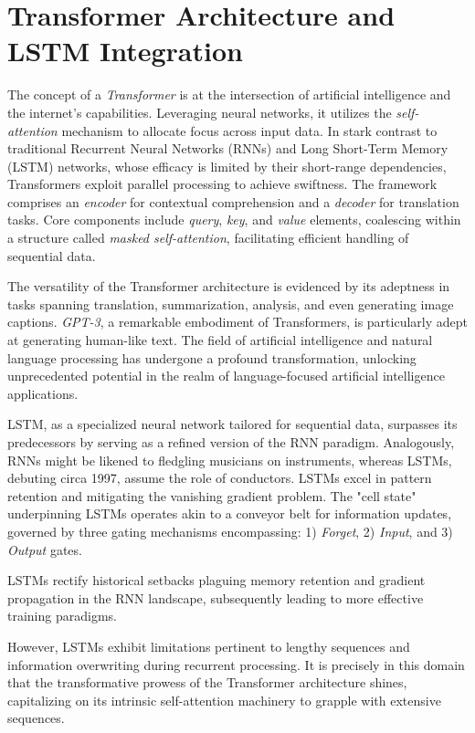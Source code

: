 \documentclass{article}
\begin{document}
\section*{Transformer Architecture and LSTM Integration}

The concept of a \textit{Transformer} is at the intersection of artificial intelligence and the internet's capabilities. Leveraging neural networks, it utilizes the \textit{self-attention} mechanism to allocate focus across input data. In stark contrast to traditional Recurrent Neural Networks (RNNs) and Long Short-Term Memory (LSTM) networks, whose efficacy is limited by their short-range dependencies, Transformers exploit parallel processing to achieve swiftness. The framework comprises an \textit{encoder} for contextual comprehension and a \textit{decoder} for translation tasks. Core components include \textit{query}, \textit{key}, and \textit{value} elements, coalescing within a structure called \textit{masked self-attention}, facilitating efficient handling of sequential data.

The versatility of the Transformer architecture is evidenced by its adeptness in tasks spanning translation, summarization, analysis, and even generating image captions. \textit{GPT-3}, a remarkable embodiment of Transformers, is particularly adept at generating human-like text. The field of artificial intelligence and natural language processing has undergone a profound transformation, unlocking unprecedented potential in the realm of language-focused artificial intelligence applications.

LSTM, as a specialized neural network tailored for sequential data, surpasses its predecessors by serving as a refined version of the RNN paradigm. Analogously, RNNs might be likened to fledgling musicians on instruments, whereas LSTMs, debuting circa 1997, assume the role of conductors. LSTMs excel in pattern retention and mitigating the vanishing gradient problem. The "cell state" underpinning LSTMs operates akin to a conveyor belt for information updates, governed by three gating mechanisms encompassing: 1) \textit{Forget}, 2) \textit{Input}, and 3) \textit{Output} gates.

LSTMs rectify historical setbacks plaguing memory retention and gradient propagation in the RNN landscape, subsequently leading to more effective training paradigms.

However, LSTMs exhibit limitations pertinent to lengthy sequences and information overwriting during recurrent processing. It is precisely in this domain that the transformative prowess of the Transformer architecture shines, capitalizing on its intrinsic self-attention machinery to grapple with extensive sequences.
\end{document}
